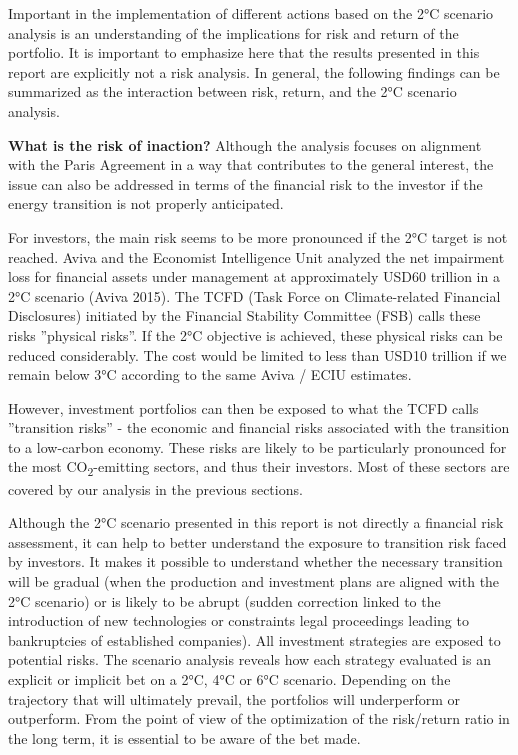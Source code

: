 \documentclass[10pt,table,a4]{article}\usepackage[]{graphicx}\usepackage[]{color}
\begin{document}
		\begin{multicols}{2}
				Important in the implementation of different actions based on the 2°C scenario analysis is an understanding of the implications for risk and return of the portfolio. It is important to emphasize here that the results presented in this report are explicitly not a risk analysis. In general, the following findings can be summarized as the interaction between risk, return, and the 2°C scenario analysis. 
			
			\textbf{What is the risk of inaction?}
			Although the analysis focuses on alignment with the Paris Agreement in a way that contributes to the general interest, the issue can also be addressed in terms of the financial risk to the investor if the energy transition is not properly anticipated. 
			
			For investors, the main risk seems to be more pronounced if the 2°C target is not reached. Aviva and the Economist Intelligence Unit analyzed the net impairment loss for financial assets under management at approximately USD60 trillion in a 2°C scenario (Aviva 2015). The TCFD (Task Force on Climate-related Financial Disclosures) initiated by the Financial Stability Committee (FSB) calls these risks ”physical risks”. If the 2°C objective is achieved, these physical risks can be reduced considerably. The cost would be limited to less than USD10 trillion if we remain below 3°C according to the same Aviva / ECIU estimates. 
			
			However, investment portfolios can then be exposed to what the TCFD calls ”transition risks” - the economic and financial risks associated with the transition to a low-carbon economy. These risks are likely to be particularly pronounced for the most CO\textsubscript{2}-emitting sectors, and thus their investors. Most of these sectors are covered by our analysis in the previous sections. 
			
			Although the 2°C scenario presented in this report is not directly a financial risk assessment, it can help to better understand the exposure to transition risk faced by investors. It makes it possible to understand whether the necessary transition will be gradual (when the production and investment plans are aligned with the 2°C scenario) or is likely to be abrupt (sudden correction linked to the introduction of new technologies or constraints legal proceedings leading to bankruptcies of established companies). All investment strategies are exposed to potential risks. The scenario analysis reveals how each strategy evaluated is an explicit or implicit bet on a 2°C, 4°C or 6°C scenario. Depending on the trajectory that will ultimately prevail, the portfolios will underperform or outperform. From the point of view of the optimization of the risk/return ratio in the long term, it is essential to be aware of the bet made.
			

\end{multicols}
\end{document}
